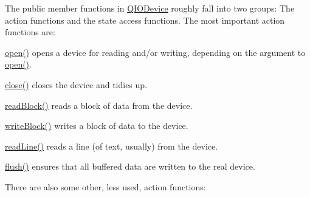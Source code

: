 The public member functions in \hyperlink{class_q_i_o_device}{Q\+I\+O\+Device} roughly fall into two groups\+: The action functions and the state access functions. The most important action functions are\+: 
\begin{DoxyItemize}
\item \hyperlink{class_q_i_o_device_ae4046ae7bf4d4cee1010239973314e42}{open()} opens a device for reading and/or writing, depending on the argument to \hyperlink{class_q_i_o_device_ae4046ae7bf4d4cee1010239973314e42}{open()}.


\item \hyperlink{class_q_i_o_device_a01a9ddac5d964b5b6a1f10005bf28a4f}{close()} closes the device and tidies up.


\item \hyperlink{class_q_i_o_device_a71f10647e4bd98141f45362b9a06983a}{read\+Block()} reads a block of data from the device.


\item \hyperlink{class_q_i_o_device_a5d937df1bde2f956872dd54e077807d1}{write\+Block()} writes a block of data to the device.


\item \hyperlink{class_q_i_o_device_a4dc865ffcb5b7896ff8f9a1d828e4c0e}{read\+Line()} reads a line (of text, usually) from the device.


\item \hyperlink{class_q_i_o_device_a39eccb592ae076fbc42108a3d590fb43}{flush()} ensures that all buffered data are written to the real device.


\end{DoxyItemize}There are also some other, less used, action functions\+: 
